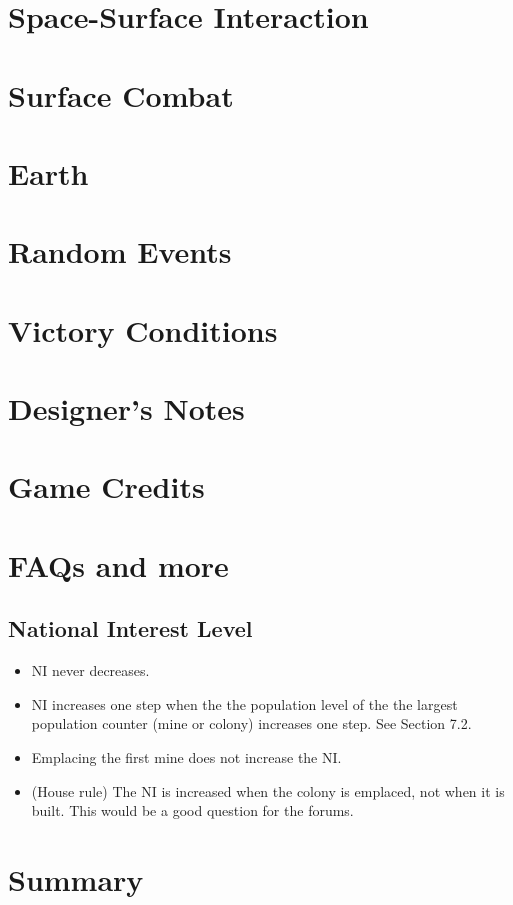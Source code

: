 \documentclass[10pt]{article}
\begin{document}
\begin{multicols}{2}
\section{Space-Surface Interaction}

\section{Surface Combat}

\section{Earth}

\section{Random Events}

\section{Victory Conditions}

\section{Designer's Notes}

\section{Game Credits}


\section{FAQs and more}

\subsection{National Interest Level}

\begin{itemize}
  \item NI never decreases.
  \item NI increases one step when the the population level of the the largest
    population counter (mine or colony) increases one step. See Section 7.2.
  \item Emplacing the first mine does not increase the NI.
  \item (House rule) The NI is increased when the colony is emplaced, not when
    it is built. This would be a good question for the forums.
\end{itemize}
\section{Summary}

\end{multicols}
\end{document}
